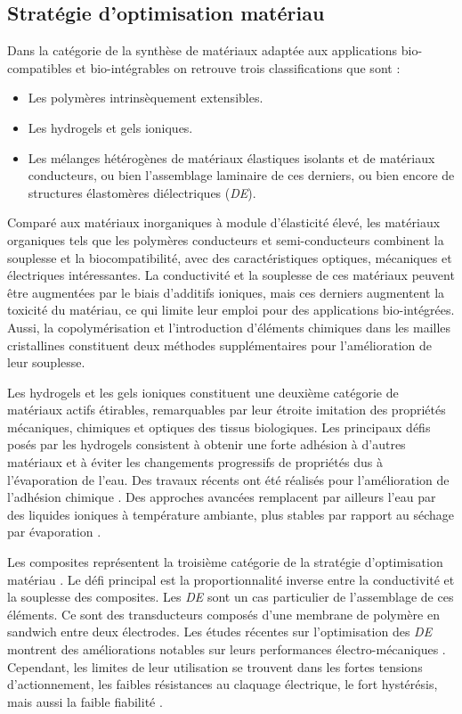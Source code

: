 	\subsection{Stratégie d'optimisation matériau}
	\label{subsec:1.2.1_Strategie materiau}
Dans la catégorie de la synthèse de matériaux adaptée aux applications bio-compatibles et bio-intégrables on retrouve trois classifications que sont :
\begin{itemize}[label=$\bullet$]
	\item Les polymères intrinsèquement extensibles.
 	\item Les hydrogels et gels ioniques.
 	\item Les mélanges hétérogènes de matériaux élastiques isolants et de matériaux conducteurs, ou bien l'assemblage laminaire de ces derniers, ou bien encore de structures élastomères diélectriques (\emph{DE}).
\end{itemize}

Comparé aux matériaux inorganiques à module d'élasticité élevé, les matériaux organiques tels que les polymères conducteurs et semi-conducteurs combinent la souplesse et la biocompatibilité, avec des caractéristiques optiques, mécaniques et électriques intéressantes. La conductivité et la souplesse de ces matériaux peuvent être augmentées par le biais d'additifs ioniques, mais ces derniers augmentent la toxicité du matériau, ce qui limite leur emploi pour des applications bio-intégrées. Aussi, la copolymérisation \cite{Muller2007} et l'introduction d'éléments chimiques dans les mailles cristallines \cite{Wang2016b} constituent deux méthodes supplémentaires pour l'amélioration de leur souplesse.

Les hydrogels et les gels ioniques constituent une deuxième catégorie de matériaux actifs étirables, remarquables par leur étroite imitation des propriétés mécaniques, chimiques et optiques des tissus biologiques. Les principaux défis posés par les hydrogels consistent à obtenir une forte adhésion à d'autres matériaux et à éviter les changements progressifs de propriétés dus à l'évaporation de l'eau. Des travaux récents ont été réalisés pour l'amélioration de l'adhésion chimique \cite{Tang2016}. Des approches avancées remplacent par ailleurs l'eau par des liquides ioniques à température ambiante, plus stables par rapport au séchage par évaporation \cite{Xie2018}.

Les composites représentent la troisième catégorie de la stratégie d'optimisation matériau \cite{Li2007}. Le défi principal est la proportionnalité inverse entre la conductivité et la souplesse des composites. Les \emph{DE} sont un cas particulier de l'assemblage de ces éléments. Ce sont des transducteurs composés d'une membrane de polymère en sandwich entre deux électrodes. Les études récentes sur l'optimisation des \emph{DE} montrent des améliorations notables sur leurs performances électro-mécaniques \cite{Lu2020}. Cependant, les limites de leur utilisation se trouvent dans les fortes tensions d'actionnement, les faibles résistances au claquage électrique, le fort hystérésis, mais aussi la faible fiabilité \cite{Zhao2010,Lv2018}.
